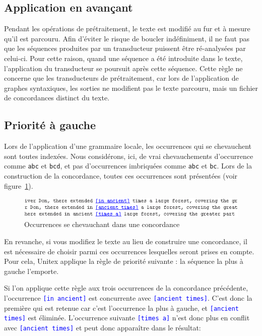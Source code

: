 \subsection{Application en avançant}
Pendant les opérations de prétraitement, le texte est modifié au fur et à mesure qu’il
est parcouru. Afin d’éviter le risque de boucler indéfiniment, il ne faut pas que les 
séquences produites par un transducteur puissent être ré-analysées par celui-ci. Pour cette
raison, quand une séquence a été introduite dans le texte, l’application du transducteur se
poursuit après cette séquence.
Cette règle ne concerne que les transducteurs de prétraitement, car lors de l’application
de graphes syntaxiques, les sorties ne modifient pas le texte parcouru, mais un fichier de
concordances distinct du texte.


\subsection{Priorité à gauche}
\label{section-priorite-gauche}
 
Lors de l’application d’une grammaire locale, les occurrences qui se chevauchent sont
toutes indexées.
Nous considérons, ici, de vrai chevauchements d'occurrence comme \verb+abc+ et \verb+bcd+, et
pas d'occurrences imbriquées comme \verb+abc+ et \verb+bc+.
Lors de la construction de la concordance, toutes ces occurrences sont présentées
(voir figure~\ref{fig-overlappping-occurrences}).

\begin{figure}[!ht]
\begin{center}
\includegraphics[width=13cm]{resources/img/fig6-24.png}
\caption{Occurrences se chevauchant dans une concordance\label{fig-overlappping-occurrences}}
\end{center}
\end{figure}

\noindent En revanche, si vous modifiez le texte au lieu de construire une concordance, il est
nécessaire de choisir parmi ces occurrences lesquelles seront prises en compte. Pour cela, Unitex
 applique la règle de priorité suivante : la séquence la plus à gauche l’emporte.

\bigskip
\noindent Si l’on applique cette règle aux trois occurrences de la concordance précédente, l’occurrence \textcolor{blue}{\texttt{[in ancient]}} est concurrente avec 
\textcolor{blue}{\texttt{[ancient times]}}. C’est donc la première qui
est retenue car c’est l’occurrence la plus à gauche, et \textcolor{blue}{\texttt{[ancient times]}} est
éliminée. L’occurrence suivante  \textcolor{blue}{\texttt{[times a]}} n’est donc plus en conflit avec 
\textcolor{blue}{\texttt{[ancient times]}} et peut donc apparaître dans le résultat:

